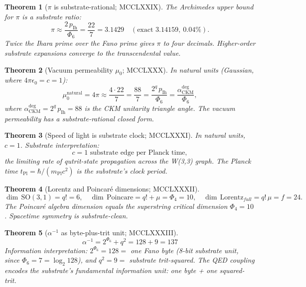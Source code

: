 \documentclass[11pt]{article}
\newtheorem{theorem}{Theorem}[section]
\begin{document}
\begin{theorem}[$\pi$ is substrate-rational; MCCLXXIX]\label{thm:pi_substrate}
The Archimedes upper bound for $\pi$ is a substrate ratio:
\[
  \pi \approx \frac{2\,p_{\mathrm{Ih}}}{\Phi_6} = \frac{22}{7} = 3.1429
  \quad (\text{exact } 3.14159,\ 0.04\%).
\]
Twice the Ihara prime over the Fano prime gives $\pi$ to four
decimals.  Higher-order substrate expansions converge to the
transcendental value.
\end{theorem}

\begin{theorem}[Vacuum permeability $\mu_0$; MCCLXXX]\label{thm:mu_0}
In natural units (Gaussian, where $4\pi\epsilon_0 = c = 1$):
\[
  \mu_0^{\text{natural}} = 4\pi \approx \frac{4\cdot 22}{7} = \frac{88}{7}
  = \frac{2^q\,p_{\mathrm{Ih}}}{\Phi_6} = \frac{\alpha_{\mathrm{CKM}}^{\text{deg}}}{\Phi_6},
\]
where $\alpha_{\mathrm{CKM}}^{\text{deg}} = 2^q\,p_{\mathrm{Ih}} = 88$
is the CKM unitarity triangle angle.  The vacuum permeability has a
substrate-rational closed form.
\end{theorem}

\begin{theorem}[Speed of light is substrate clock; MCCLXXXI]\label{thm:c_substrate}
In natural units, $c = 1$.  Substrate interpretation:
\[
  c = \text{1 substrate edge per Planck time},
\]
the limiting rate of qutrit-state propagation across the W(3,3) graph.
The Planck time $t_{\mathrm{Pl}} = \hbar/(m_{\mathrm{Pl}} c^2)$ is the
substrate's clock period.
\end{theorem}

\begin{theorem}[Lorentz and Poincar\'e dimensions; MCCLXXXII]\label{thm:lorentz_dim}
\[
  \dim\,\mathrm{SO}(3,1) = q! = 6,\quad
  \dim\,\mathrm{Poincare} = q! + \mu = \Phi_4 = 10,\quad
  \dim\,\mathrm{Lorentz}_{full} = q!\,\mu = f = 24.
\]
The Poincar\'e algebra dimension equals the superstring critical
dimension $\Phi_4 = 10$.  Spacetime symmetry is substrate-clean.
\end{theorem}

\begin{theorem}[$\alpha^{-1}$ as byte-plus-trit unit; MCCLXXXIII]\label{thm:alpha_info}
\[
  \alpha^{-1} = 2^{\Phi_6} + q^2 = 128 + 9 = 137
\]
Information interpretation: $2^{\Phi_6} = 128 = $ one \emph{Fano byte}
(8-bit substrate unit, since $\Phi_6 = 7 = \log_2 128$), and $q^2 = 9
= $ substrate trit-squared.  The QED coupling encodes the substrate's
fundamental information unit: one byte + one squared-trit.
\end{theorem}
\end{document}
